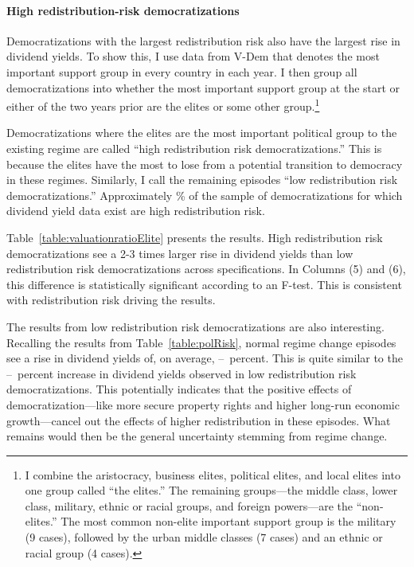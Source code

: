 \paragraph{High redistribution-risk democratizations}
\label{par:red_risk_beg}
Democratizations with the largest redistribution risk also have the largest rise in dividend yields. To show this, I use data from V-Dem that denotes the most important support group in every country in each year. I then group all democratizations into whether the most important support group at the start or either of the two years prior are the elites or some other group.\footnote{I combine the aristocracy, business elites, political elites, and local elites into one group called ``the elites.'' The remaining groups---the middle class, lower class, military, ethnic or racial groups, and foreign powers---are the ``non-elites.'' The most common non-elite important support group is the military (9 cases), followed by the urban middle classes (7 cases) and an ethnic or racial group (4 cases).} 

Democratizations where the elites are the most important political group to the existing regime are called ``high redistribution risk democratizations.'' This is because the elites have the most to lose from a potential transition to democracy in these regimes. Similarly, I call the remaining episodes ``low redistribution risk democratizations.'' Approximately \pctHighRedistRisk\% of the sample of democratizations for which dividend yield data exist are high redistribution risk.

Table~\ref{table:valuationratioElite} presents the results. High redistribution risk democratizations see a 2-3 times larger rise in dividend yields than low redistribution risk democratizations across specifications. In Columns (5) and (6), this difference is statistically significant according to an F-test. This is consistent with redistribution risk driving the results.

The results from low redistribution risk democratizations are also interesting. Recalling the results from Table~\ref{table:polRisk}, normal regime change episodes see a rise in dividend yields of, on average, \tabThreeRegChLow\---\tabThreeRegChHigh\ percent. This is quite similar to the \tabTenLowRiskLow\---\tabTenLowRiskHigh\ percent increase in dividend yields observed in low redistribution risk democratizations. This potentially indicates that the positive effects of democratization---like more secure property rights and higher long-run economic growth---cancel out the effects of higher redistribution in these episodes. What remains would then be the general uncertainty stemming from regime change.

